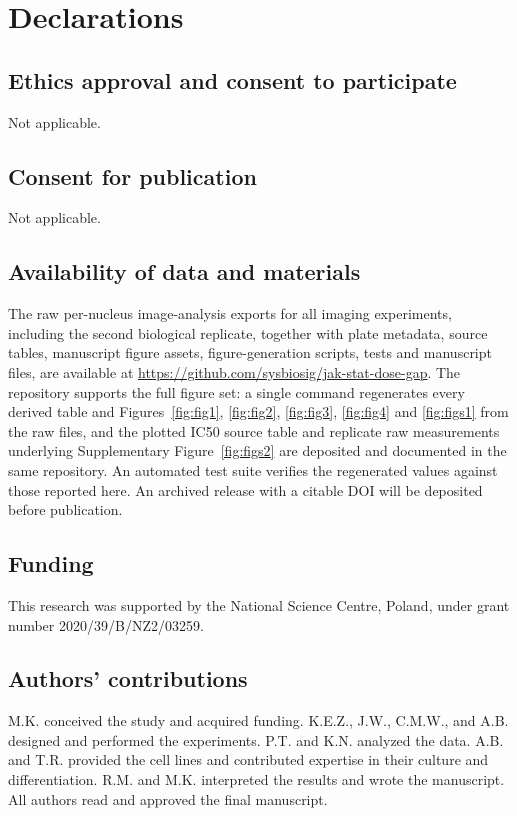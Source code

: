 \documentclass[11pt]{article}
\begin{document}
\section*{Declarations}

\subsection*{Ethics approval and consent to participate}

Not applicable.

\subsection*{Consent for publication}

Not applicable.

\subsection*{Availability of data and materials}

The raw per-nucleus image-analysis exports for all imaging experiments, including the second biological replicate, together with plate metadata, source tables, manuscript figure assets, figure-generation scripts, tests and manuscript files, are available at \url{https://github.com/sysbiosig/jak-stat-dose-gap}. The repository supports the full figure set: a single command regenerates every derived table and Figures~\ref{fig:fig1}, \ref{fig:fig2}, \ref{fig:fig3}, \ref{fig:fig4} and \ref{fig:figs1} from the raw files, and the plotted IC50 source table and replicate raw measurements underlying Supplementary Figure~\ref{fig:figs2} are deposited and documented in the same repository. An automated test suite verifies the regenerated values against those reported here. An archived release with a citable DOI will be deposited before publication.

\subsection*{Funding}

This research was supported by the National Science Centre, Poland, under grant number 2020/39/B/NZ2/03259.

\subsection*{Authors' contributions}

M.K. conceived the study and acquired funding.
K.E.Z., J.W., C.M.W., and A.B. designed and performed the experiments.
P.T. and K.N. analyzed the data. A.B. and T.R. provided the cell lines and contributed expertise in their culture and differentiation.
R.M. and M.K. interpreted the results and wrote the manuscript. All authors read and approved the final manuscript.
\end{document}
